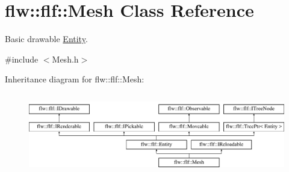 \hypertarget{classflw_1_1flf_1_1Mesh}{}\section{flw\+:\+:flf\+:\+:Mesh Class Reference}
\label{classflw_1_1flf_1_1Mesh}


Basic drawable \hyperlink{classflw_1_1flf_1_1Entity}{Entity}.  




{\ttfamily \#include $<$Mesh.\+h$>$}

Inheritance diagram for flw\+:\+:flf\+:\+:Mesh\+:\begin{figure}[H]
\begin{center}
\leavevmode
\includegraphics[height=3.589744cm]{classflw_1_1flf_1_1Mesh}
\end{center}
\end{figure}
